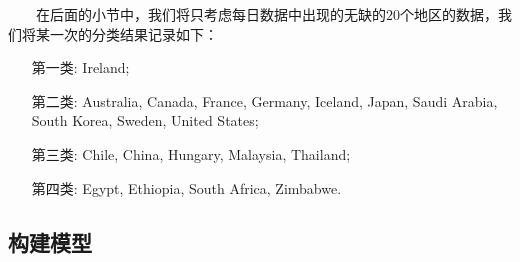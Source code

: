 \documentclass[a4paper, titlepage]{article}
\begin{document}
    　　在后面的小节中，我们将只考虑每日数据中出现的无缺的$20$个地区的数据，我们将某一次的分类结果记录如下：
    \vspace{5pt}
    \begin{adjustwidth}{0.6cm}{0cm}
    \begin{itemize}
        \item [第一类:] Ireland;
        \item [第二类:] Australia, Canada, France, Germany, Iceland, Japan, Saudi Arabia, South Korea, Sweden, United States;
        \item [第三类:] Chile, China, Hungary, Malaysia, Thailand;
        \item [第四类:] Egypt, Ethiopia, South Africa, Zimbabwe.
    \end{itemize}
    \end{adjustwidth}
    \vspace{5pt}
    \subsection{构建模型}
\end{document}
